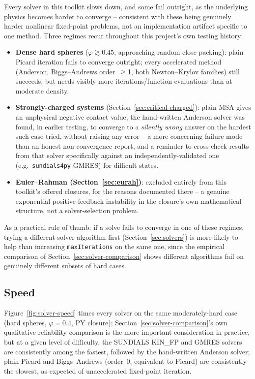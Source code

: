 \documentclass[11pt,a4paper]{article}
\newcommand{\code}[1]{\texttt{#1}}
\begin{document}
Every solver in this toolkit slows down, and some fail outright, as the
underlying physics becomes harder to converge -- consistent with these being
genuinely harder nonlinear fixed-point problems, not an implementation
artifact specific to one method. Three regimes recur throughout this
project's own testing history:
\begin{itemize}[nosep]
  \item \textbf{Dense hard spheres} ($\varphi\gtrsim0.45$, approaching random
    close packing): plain Picard iteration fails to converge outright; every
    accelerated method (Anderson, Biggs--Andrews order~$\ge$1, both
    Newton--Krylov families) still succeeds, but needs visibly more
    iterations/function evaluations than at moderate density.
  \item \textbf{Strongly-charged systems} (Section~\ref{sec:critical-charged}):
    plain MSA gives an unphysical negative contact value; the hand-written
    Anderson solver was found, in earlier testing, to converge to a
    \emph{silently wrong} answer on the hardest such case tried, without
    raising any error -- a more concerning failure mode than an honest
    non-convergence report, and a reminder to cross-check results from that
    solver specifically against an independently-validated one (e.g.\
    \code{sundials4py} GMRES) for difficult states.
  \item \textbf{Euler--Rahman (Section~\ref{sec:eurah})}: excluded entirely
    from this toolkit's offered closures, for the reasons documented there --
    a genuine exponential positive-feedback instability in the closure's own
    mathematical structure, not a solver-selection problem.
\end{itemize}
As a practical rule of thumb: if a solve fails to converge in one of these
regimes, trying a different solver algorithm first (Section~\ref{sec:solvers})
is more likely to help than increasing \code{maxIterations} on the same one,
since the empirical comparison of Section~\ref{sec:solver-comparison} shows
different algorithms fail on genuinely different subsets of hard cases.

\subsection{Speed}
\label{sec:speed-tests}

Figure~\ref{fig:solver-speed} times every solver on the same moderately-hard
case (hard spheres, $\varphi=0.4$, PY closure); Section~\ref{sec:solver-comparison}'s
own qualitative reliability comparison is the more important consideration in
practice, but at a given level of difficulty, the SUNDIALS KIN\_FP and GMRES
solvers are consistently among the fastest, followed by the hand-written
Anderson solver; plain Picard and Biggs--Andrews (order~0, equivalent to
Picard) are consistently the slowest, as expected of unaccelerated fixed-point
iteration.
\end{document}

